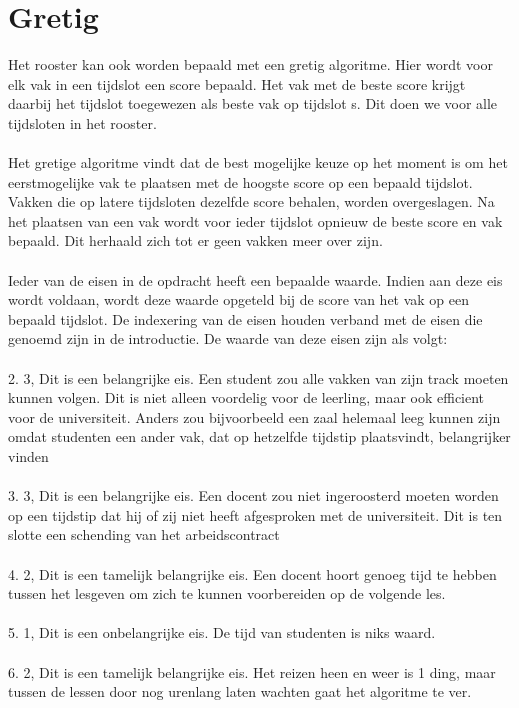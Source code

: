 \documentclass{article}
\begin{document}
\section{Gretig}
Het rooster kan ook worden bepaald met een gretig algoritme.
Hier wordt voor elk vak in een tijdslot een score bepaald. Het vak met de beste score krijgt daarbij het tijdslot toegewezen als beste vak op tijdslot s. Dit doen we voor alle tijdsloten in het rooster.\\ \\
Het gretige algoritme vindt dat de best mogelijke keuze op het moment is om het eerstmogelijke vak te plaatsen met de hoogste score op een bepaald tijdslot. Vakken die op latere tijdsloten dezelfde score behalen, worden overgeslagen. Na het plaatsen van een vak wordt voor ieder tijdslot opnieuw de beste score en vak bepaald. Dit herhaald zich tot er geen vakken meer over zijn.\\ \\
Ieder van de eisen in de opdracht heeft een bepaalde waarde. Indien aan deze eis wordt voldaan, wordt deze waarde opgeteld bij de score van het vak op een bepaald tijdslot. De indexering van de eisen houden verband met de eisen die genoemd zijn in de introductie. De waarde van deze eisen zijn als volgt:\\ \\
2. 3, Dit is een belangrijke eis. Een student zou alle vakken van zijn track moeten kunnen volgen. Dit is niet alleen voordelig voor de leerling, maar ook efficient voor de universiteit. Anders zou bijvoorbeeld een zaal helemaal leeg kunnen zijn omdat studenten een ander vak, dat op hetzelfde tijdstip plaatsvindt, belangrijker vinden        \\ \\
3. 3, Dit is een belangrijke eis. Een docent zou niet ingeroosterd moeten worden op een tijdstip dat hij of zij niet heeft afgesproken met de universiteit. Dit is ten slotte een schending van het arbeidscontract         \\  \\
4. 2, Dit is een tamelijk belangrijke eis. Een docent hoort genoeg tijd te hebben tussen het lesgeven om zich te kunnen voorbereiden op de volgende les.\\\\
5. 1, Dit is een onbelangrijke eis. De tijd van studenten is niks waard.\\\\
6. 2, Dit is een tamelijk belangrijke eis. Het reizen heen en weer is 1 ding, maar tussen de lessen door nog urenlang laten wachten gaat het algoritme te ver.\\\\
\end{document}

